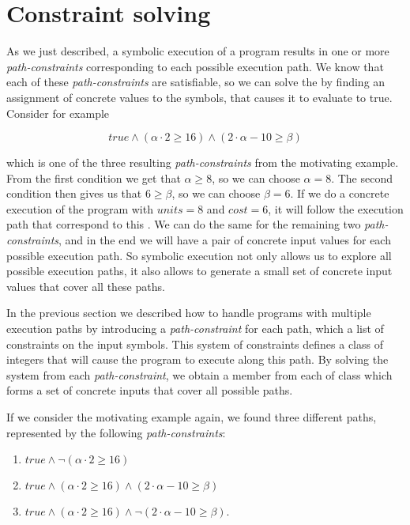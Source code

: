 		
\section{Constraint solving}
	As we just described, a symbolic execution of a program results in one or more \emph{path-constraints} corresponding to each possible execution path. We know that each of these \emph{path-constraints} are satisfiable, so we can solve the \pc by finding an assignment of concrete values to the symbols, that causes it to evaluate to true. Consider for example 
	
	\begin{equation*}
		true \land (\alpha \cdot 2 \geq 16) \land (2\cdot \alpha - 10 \geq \beta)
	\end{equation*}
	
	which is one of the three resulting \emph{path-constraints} from the motivating example. From the first condition we get that $\alpha \geq 8$, so we can choose $\alpha = 8$. The second condition then gives us that $6 \geq \beta$, so we can choose $\beta = 6$. If we do a concrete execution of the program with $units = 8$ and $cost = 6$, it will follow the execution path that correspond to this \pc. We can do the same for the remaining two \emph{path-constraints}, and in the end we will have a pair of concrete input values for each possible execution path. So symbolic execution not only allows us to explore all possible execution paths, it also allows to generate a small set of concrete input values that cover all these paths.  

	
	\iffalse
	In the previous section we described how to handle programs with multiple execution paths by introducing a \emph{path-constraint} for each path, which a list of constraints on the input symbols. This system of constraints defines a class of integers that will cause the program to execute along this path. By solving the system from each \emph{path-constraint}, we obtain a member from each of class which forms a set of concrete inputs that cover all possible paths.    
	
	If we consider the motivating example again, we found three different paths, represented by the following \emph{path-constraints}:
	\begin{enumerate}
		\item $true \land \neg (\alpha \cdot 2 \geq 16)$
		\item $true \land (\alpha \cdot 2 \geq 16) \land (2\cdot \alpha - 10 \geq \beta)$
		\item $true \land (\alpha \cdot 2 \geq 16) \land \neg (2\cdot \alpha - 10 \geq \beta)$.
	\end{enumerate}
	
